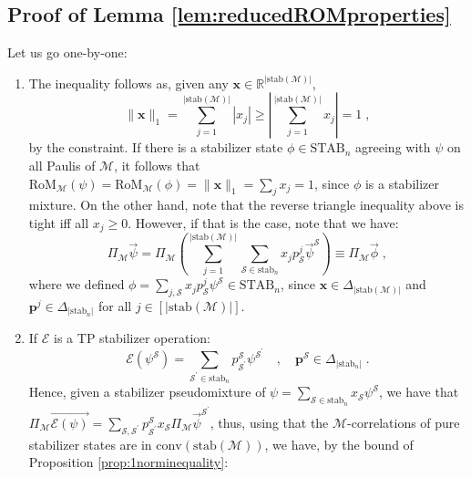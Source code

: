 \documentclass[10pt,aps,pra,twocolumn,floatfix,nofootinbib,superscriptaddress,longbibliography]{revtex4-2}
\newcommand{\1}{\mathbbm{1}}
\begin{document}
\subsection{Proof of Lemma \ref{lem:reducedROMproperties}\label{proof:reducedromproperties}}
\noindent 
Let us go one-by-one:
\begin{enumerate}
    \item The inequality follows as, given any $\mathbf x \in \mathbb R^{|\mathrm{stab}(\mathcal M)|}$,
    \begin{equation}
        \|\mathbf x\|_1 = \sum_{j=1}^{|\mathrm{stab}(\mathcal M)|}|x_j| \geq \left |\sum_{j=1}^{|\mathrm{stab}(\mathcal M)|} x_j\right|=1\;,
    \end{equation}
    by the constraint. If there is a stabilizer state $\phi \in \mathrm{STAB}_n$ agreeing with $\psi$ on all Paulis of $\mathcal M$, it follows that $\mathrm{RoM}_\mathcal M(\psi) =\mathrm{RoM}_\mathcal M(\phi)=\|\mathbf x\|_1=\sum_{j} x_j=1$, since $\phi$ is a stabilizer mixture. On the other hand, note that the reverse triangle inequality above is tight iff all $x_j\geq 0$. However, if that is the case, note that we have:
    \begin{equation}
        \Pi_\mathcal M \vec{\psi} =\Pi _\mathcal M\left(\sum_{j=1}^{|\mathrm{stab}(\mathcal M)|} \sum_{\mathcal S \in \mathrm{stab}_n}x_j p^j_\mathcal S \vec{\psi}^\mathcal S\right) \equiv \Pi_\mathcal M \vec{\phi}\;,
    \end{equation}
    where we defined $\phi =\sum_{j, \mathcal S}x_j p^j_\mathcal S \psi^\mathcal S \in \mathrm{STAB}_n$, since $\mathbf x \in \Delta_{|\mathrm{stab}(\mathcal M)|}$ and $\mathbf p^j \in \Delta_{|\mathrm{stab}_n|}$ for all $j \in [|\mathrm{stab}(\mathcal M)|]$.
    \item If $\mathcal E$ is a TP stabilizer operation:
    \begin{equation}
        \mathcal E(\psi^\mathcal S) =\sum_{\mathcal S^\prime \in \mathrm{stab}_n}p^\mathcal S_{\mathcal S^\prime} \psi^{\mathcal S^\prime} \quad, \quad \mathbf p^\mathcal S \in \Delta_{|\mathrm{stab}_n|}\;.
    \end{equation}
    Hence, given a stabilizer pseudomixture of $\psi = \sum_{\mathcal S \in \mathrm{stab}_n} x_\mathcal S \psi^\mathcal S$, we have that $\Pi_\mathcal M\vec{\mathcal E(\psi)}=\sum_{\mathcal S, \mathcal S^\prime} p^\mathcal S_{\mathcal S^\prime}x_\mathcal S \Pi_\mathcal M \vec{\psi}^{\mathcal S^\prime}$\;, thus, using that the $\mathcal M$-correlations of pure stabilizer states are in $ \mathrm{conv}(\mathrm{stab}(\mathcal M))$, we have, by the bound of Proposition \ref{prop:1norminequality}:

\end{enumerate}
\end{document}
